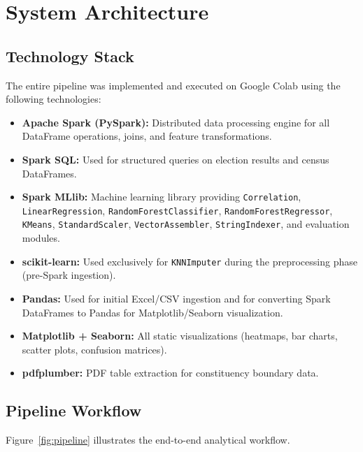 \documentclass[12pt, a4paper]{article}
\begin{document}
\section{System Architecture}

\subsection{Technology Stack}
The entire pipeline was implemented and executed on Google Colab using the following technologies:

\begin{itemize}
    \item \textbf{Apache Spark (PySpark):} Distributed data processing engine for all DataFrame operations, joins, and feature transformations.
    \item \textbf{Spark SQL:} Used for structured queries on election results and census DataFrames.
    \item \textbf{Spark MLlib:} Machine learning library providing \texttt{Correlation}, \texttt{LinearRegression}, \texttt{RandomForestClassifier}, \texttt{RandomForestRegressor}, \texttt{KMeans}, \texttt{StandardScaler}, \texttt{VectorAssembler}, \texttt{StringIndexer}, and evaluation modules.
    \item \textbf{scikit-learn:} Used exclusively for \texttt{KNNImputer} during the preprocessing phase (pre-Spark ingestion).
    \item \textbf{Pandas:} Used for initial Excel/CSV ingestion and for converting Spark DataFrames to Pandas for Matplotlib/Seaborn visualization.
    \item \textbf{Matplotlib + Seaborn:} All static visualizations (heatmaps, bar charts, scatter plots, confusion matrices).
    \item \textbf{pdfplumber:} PDF table extraction for constituency boundary data.
\end{itemize}

\subsection{Pipeline Workflow}
Figure~\ref{fig:pipeline} illustrates the end-to-end analytical workflow.
\end{document}
